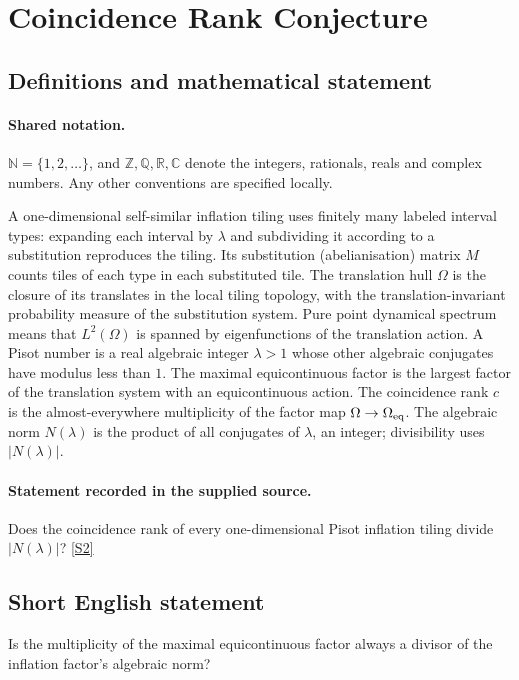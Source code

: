 \documentclass[11pt]{article}
\newcommand{\sref}[2]{\hyperlink{source:#1:#2}{[S#2]}}
\begin{document}
\section{Coincidence Rank Conjecture}\label{statement}

\subsection{Definitions and mathematical statement}

\paragraph{Shared notation.}$\mathbb N=\{1,2,\ldots\}$, and $\mathbb Z,\mathbb Q,\mathbb R,\mathbb C$ denote the integers, rationals, reals and complex numbers. Any other conventions are specified locally.


A one-dimensional self-similar inflation tiling uses finitely many labeled interval types: expanding each interval by $\lambda$ and subdividing it according to a substitution reproduces the tiling. Its substitution (abelianisation) matrix $M$ counts tiles of each type in each substituted tile. The translation hull $\Omega$ is the closure of its translates in the local tiling topology, with the translation-invariant probability measure of the substitution system. Pure point dynamical spectrum means that $L^2(\Omega)$ is spanned by eigenfunctions of the translation action. A Pisot number is a real algebraic integer $\lambda>1$ whose other algebraic conjugates have modulus less than $1$. The maximal equicontinuous factor is the largest factor of the translation system with an equicontinuous action. The coincidence rank $c$ is the almost-everywhere multiplicity of the factor map $\Omega\to\Omega_{\rm eq}$. The algebraic norm $N(\lambda)$ is the product of all conjugates of $\lambda$, an integer; divisibility uses $|N(\lambda)|$.
\paragraph{Statement recorded in the supplied source.}
Does the coincidence rank of every one-dimensional Pisot inflation tiling divide $|N(\lambda)|$? \sref{statement}{2}
\subsection{Short English statement}
Is the multiplicity of the maximal equicontinuous factor always a divisor of the inflation factor’s algebraic norm?
\end{document}
